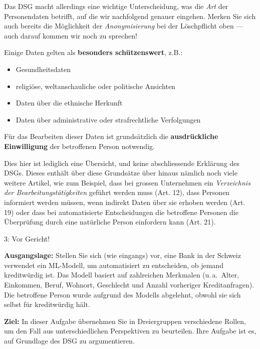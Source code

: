 \begin{lpu}
Das DSG macht allerdings eine wichtige Unterscheidung, was die \textit{Art} der Personendaten betrifft, auf die wir nachfolgend genauer eingehen. Merken Sie sich auch bereits die Möglichkeit der \textit{Anonymisierung} bei der Löschpflicht oben — auch darauf kommen wir noch zu sprechen!

\begin{theorie}

Einige Daten gelten als \textbf{besonders schützenswert}, z.B.:

\begin{itemize}
  \item Gesundheitsdaten
  \item religiöse, weltanschauliche oder politische Ansichten
  \item Daten über die ethnische Herkunft
  \item Daten über administrative oder strafrechtliche Verfolgungen
\end{itemize}

Für das Bearbeiten dieser Daten ist grundsätzlich die \textbf{ausdrückliche Einwilligung} der betroffenen Person notwendig.
\end{theorie}

Dies hier ist lediglich eine Übersicht, und keine abschliessende Erklärung des DSGs. Dieses enthält über diese Grundsätze über hinaus nämlich noch viele weitere Artikel, wie zum Beispiel, dass bei grossen Unternehmen ein \textit{Verzeichnis der Bearbeitungstätigkeiten} geführt werden muss (Art. 12), dass Personen informiert werden müssen, wenn indirekt Daten über sie erhoben werden (Art. 19) oder dass bei automatisierte Entscheidungen die betroffene Personen die Überprüfung durch eine natürliche Person einfordern kann (Art. 21).

\begin{aufgabe}{3: Vor Gericht!}

\textbf{Ausgangslage:}  
Stellen Sie sich (wie eingangs) vor, eine Bank in der Schweiz verwendet ein ML-Modell, um automatisiert zu entscheiden, ob jemand kreditwürdig ist. Das Modell basiert auf zahlreichen Merkmalen (u.\,a.\ Alter, Einkommen, Beruf, Wohnort, Geschlecht und Anzahl vorheriger Kreditanfragen). Die betroffene Person wurde aufgrund des Modells abgelehnt, obwohl sie sich selbst für kreditwürdig hält.

\textbf{Ziel:}  
In dieser Aufgabe übernehmen Sie in Dreiergruppen verschiedene Rollen, um den Fall aus unterschiedlichen Perspektiven zu beurteilen. Ihre Aufgabe ist es, auf Grundlage des DSG zu argumentieren.


\end{aufgabe}
\end{lpu}

